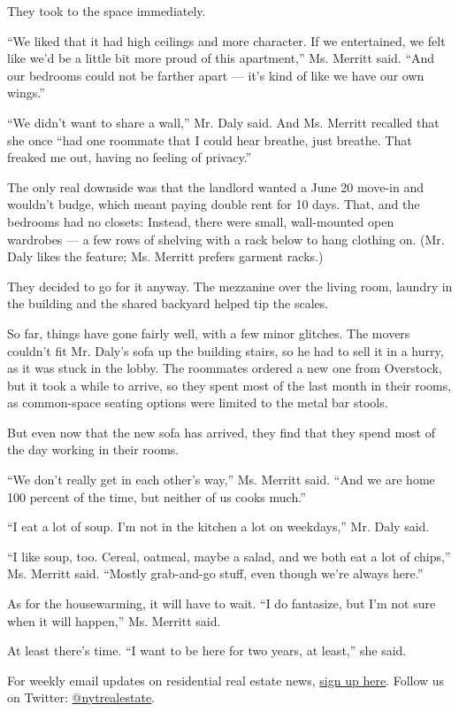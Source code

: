 They took to the space immediately.

``We liked that it had high ceilings and more character. If we
entertained, we felt like we'd be a little bit more proud of this
apartment,'' Ms. Merritt said. ``And our bedrooms could not be farther
apart --- it's kind of like we have our own wings.''

``We didn't want to share a wall,'' Mr. Daly said. And Ms. Merritt
recalled that she once ``had one roommate that I could hear breathe,
just breathe. That freaked me out, having no feeling of privacy.''

The only real downside was that the landlord wanted a June 20 move-in
and wouldn't budge, which meant paying double rent for 10 days. That,
and the bedrooms had no closets: Instead, there were small, wall-mounted
open wardrobes --- a few rows of shelving with a rack below to hang
clothing on. (Mr. Daly likes the feature; Ms. Merritt prefers garment
racks.)

They decided to go for it anyway. The mezzanine over the living room,
laundry in the building and the shared backyard helped tip the scales.

So far, things have gone fairly well, with a few minor glitches. The
movers couldn't fit Mr. Daly's sofa up the building stairs, so he had to
sell it in a hurry, as it was stuck in the lobby. The roommates ordered
a new one from Overstock, but it took a while to arrive, so they spent
most of the last month in their rooms, as common-space seating options
were limited to the metal bar stools.

But even now that the new sofa has arrived, they find that they spend
most of the day working in their rooms.

``We don't really get in each other's way,'' Ms. Merritt said. ``And we
are home 100 percent of the time, but neither of us cooks much.''

``I eat a lot of soup. I'm not in the kitchen a lot on weekdays,'' Mr.
Daly said.

``I like soup, too. Cereal, oatmeal, maybe a salad, and we both eat a
lot of chips,'' Ms. Merritt said. ``Mostly grab-and-go stuff, even
though we're always here.''

As for the housewarming, it will have to wait. ``I do fantasize, but I'm
not sure when it will happen,'' Ms. Merritt said.

At least there's time. ``I want to be here for two years, at least,''
she said.

For weekly email updates on residential real estate news,
\href{http://www.nytimes3xbfgragh.onion/newsletters/realestate/}{sign up
here}. Follow us on Twitter:
\href{https://twitter.com/nytrealestate}{@nytrealestate}.

